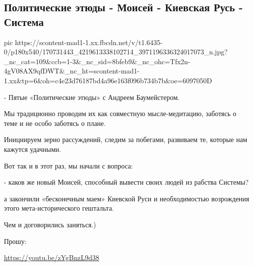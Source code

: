  
 
 
 
 
\subsection{Политические этюды - Моисей - Киевская Русь - Система}
\label{sec:08_04_2021.fb.arestovich_aleksei.1.ukraina_moisej_kievrus_beseda}

\ifcmt
  pic https://scontent-mad1-1.xx.fbcdn.net/v/t1.6435-0/p180x540/170731443_4219613338102714_3971196336324017073_n.jpg?_nc_cat=109&ccb=1-3&_nc_sid=8bfeb9&_nc_ohc=Tfx2n-4gV08AX9qfDWT&_nc_ht=scontent-mad1-1.xx&tp=6&oh=c4e23d76187bd4a96e163f096b734b7b&oe=6097050D
\fi

- Пятые «Политические этюды» с Андреем Баумейстером.

Мы традиционно проводим их как совместную мысле-медитацию, заботясь о теме и не особо заботясь о плане.

Инициируем зерно рассуждений, следим за побегами, развиваем те, которые нам кажутся удачными.

Вот так и в этот раз, мы начали с вопроса:

- каков же новый Моисей, способный вывести своих людей из рабства Системы?

а закончили «бесконечным маем» Киевской Руси и необходимостью возрождения этого
мета-исторического гештальта.

Чем и договорились заняться.)

Прошу:

\url{https://youtu.be/zYgBnzL9d38}
